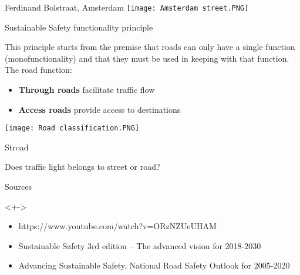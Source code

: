 \documentclass{beamer}
\begin{document}
    \begin{frame}{Ferdinand Bolstraat, Amsterdam}
        \texttt{[image: Amsterdam street.PNG]}
    \end{frame}

    \begin{frame}{Sustainable Safety functionality principle}
        \begin{block}{}
            This principle starts from the premise that roads can only have a single function (monofunctionality) and that they must be used in keeping with that function.
            The road function:\\
            \begin{itemize}
                \item \textbf{Through roads} facilitate traffic flow
                \item \textbf{Access roads} provide access to destinations
            \end{itemize}
        \end{block}
        \texttt{[image: Road classification.PNG]}
    \end{frame}

    \begin{frame}{Stroad}
        \begin{block}{}
            Does traffic light belongs to street or road?
        \end{block}
    \end{frame}

    \begin{frame}{Sources}
        \begin{block}
            <+->{}
            \begin{itemize}
                \item https://www.youtube.com/watch?v=ORzNZUeUHAM
                \item Sustainable Safety 3rd edition – The advanced vision for 2018-2030
                \item Advancing Sustainable Safety. National Road Safety Outlook for 2005-2020
            \end{itemize}
        \end{block}
    \end{frame}
\end{document}
